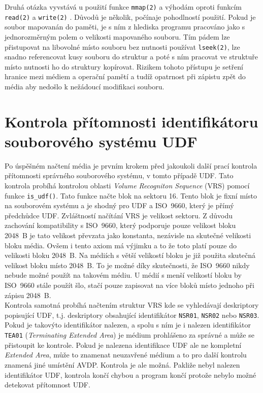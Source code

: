 Druhá otázka vyvstává u použití funkce \texttt{mmap(2)} a výhodám oproti funkcím \texttt{read(2)} \cite{man-read} a \texttt{write(2)} \cite{man-write}. Důvodů je několik, počínaje pohodlností použití. Pokud je soubor mapovanán do paměti, je s ním z hlediska programu pracováno jako s jednorozměrným polem o velikosti mapovaného souboru. Tím pádem lze přistupovat na libovolné místo souboru bez nutnosti používat \texttt{lseek(2)}, lze snadno referencovat kusy souboru do struktur a poté s ním pracovat ve struktuře místo nutnosti ho do struktury kopírovat. Rizikem tohoto přístupu je setření hranice mezi médiem a operační pamětí a tudíž opatrnost při zápistu zpět do média aby nedošlo k nežádoucí modifikaci souboru.

\section{Kontrola přítomnosti identifikátoru souborového systému UDF}
\label{sec:kontrola-pritomonosti-udf}
Po úspěšném načtení média je prvním krokem před jakoukoli další prací kontrola přítomnosti správného souborového systému, v tomto případě UDF. Tato kontrola probíhá kontrolou oblasti \textit{Volume Recogniton Sequence} (VRS) pomocí funkce \texttt{is\_udf()}. Tato funkce načte blok na sektoru 16. Tento blok je fixní místo na souborovém systému a je shodný pro UDF a ISO~9660, který je přímý předchůdce UDF. Zvláštností načítání VRS je velikost sektoru. Z důvodu zachování kompatibility s ISO~9660, který podporuje pouze velikost bloku 2048~B je tato velikost převzata jako konstanta, nezávisle na skutečné velikosti bloku média. Ovšem i tento axiom má výjimku a to že toto platí pouze do velikosti bloku 2048~B. Na médiích s větší velikostí bloku je již použita skutečná velikost bloku místo 2048~B. To je možné díky skutečnosti, že ISO~9660 nikdy nebude možné použít na takovém médiu. U médií s menší velikostí bloku by ISO~9660 stále použít šlo, stačí pouze zapisovat na více bloků místo jednoho při zápisu 2048~B.\\
Kontrola samotná probíhá načtením struktur VRS kde se vyhledávají deskriptory popisující UDF, t.j. deskriptory obsahující identifikátor \texttt{NSR01}, \texttt{NSR02} nebo \texttt{NSR03}. Pokud je takovýto identifikátor nalezen, a spolu s ním je i nalezen identifikátor \texttt{TEA01} (\textit{Terminating Extended Area}) je médium prohlášeno za správné a může se přistoupit ke kontrole. Pokud je nalezena identifikace UDF ale ne kompletní \textit{Extended Area}, může to znamenat neuzavřené médium a to pro další kontrolu znamená jiné umístění AVDP. Kontrola je ale možná. Pakliže nebyl nalezen identifikátor UDF, kontrola končí chybou a program končí protože nebylo možné detekovat přítomnost UDF.\\
